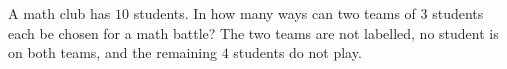 A math club has $10$ students. In how many ways can two teams of $3$ students each be chosen for a math battle? The two teams are not labelled, no student is on both teams, and the remaining $4$ students do not play.
